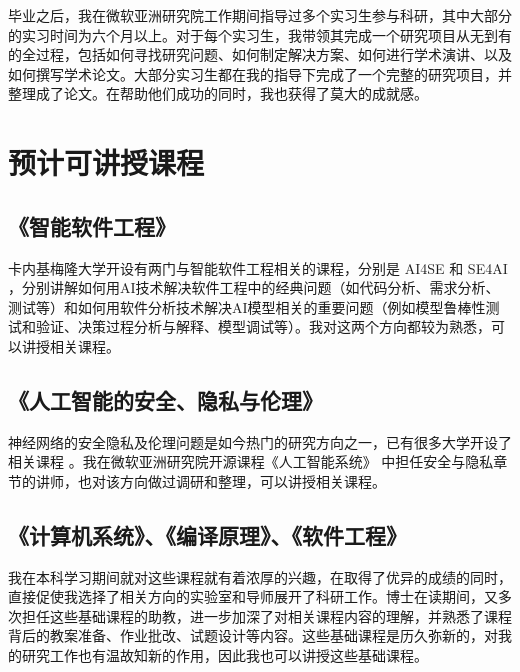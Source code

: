 \documentclass[12pt]{article}
\begin{document}
毕业之后，我在微软亚洲研究院工作期间指导过多个实习生参与科研，其中大部分的实习时间为六个月以上。对于每个实习生，我带领其完成一个研究项目从无到有的全过程，包括如何寻找研究问题、如何制定解决方案、如何进行学术演讲、以及如何撰写学术论文。大部分实习生都在我的指导下完成了一个完整的研究项目，并整理成了论文。在帮助他们成功的同时，我也获得了莫大的成就感。




\section{预计可讲授课程}

\subsection{《智能软件工程》}
卡内基梅隆大学开设有两门与智能软件工程相关的课程，分别是 AI4SE \cite{cmu:ai4se} 和 SE4AI \cite{cmu:se4ai}，分别讲解如何用AI技术解决软件工程中的经典问题（如代码分析、需求分析、测试等）和如何用软件分析技术解决AI模型相关的重要问题（例如模型鲁棒性测试和验证、决策过程分析与解释、模型调试等）。我对这两个方向都较为熟悉，可以讲授相关课程。

\subsection{《人工智能的安全、隐私与伦理》}
神经网络的安全隐私及伦理问题是如今热门的研究方向之一，已有很多大学开设了相关课程 \cite{ucb:trustworthy,ucb:fairness}。我在微软亚洲研究院开源课程《人工智能系统》 \cite{microsoft:ai-system}中担任安全与隐私章节的讲师，也对该方向做过调研和整理，可以讲授相关课程。

\subsection{《计算机系统》、《编译原理》、《软件工程》}
我在本科学习期间就对这些课程就有着浓厚的兴趣，在取得了优异的成绩的同时，直接促使我选择了相关方向的实验室和导师展开了科研工作。博士在读期间，又多次担任这些基础课程的助教，进一步加深了对相关课程内容的理解，并熟悉了课程背后的教案准备、作业批改、试题设计等内容。这些基础课程是历久弥新的，对我的研究工作也有温故知新的作用，因此我也可以讲授这些基础课程。


{


}
\end{document}
